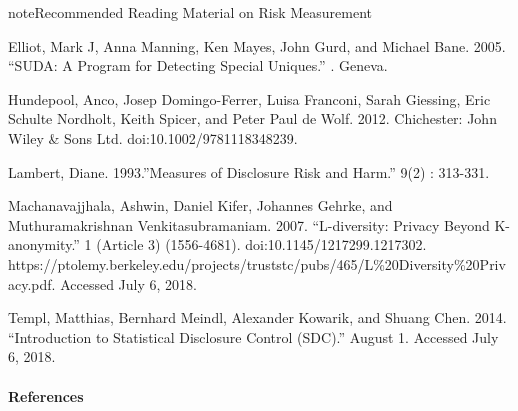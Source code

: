 \documentclass[letterpaper,10pt,english]{sphinxmanual}
\begin{document}
\begin{sphinxadmonition}{note}{Recommended Reading Material on Risk Measurement}

Elliot, Mark J, Anna Manning, Ken Mayes, John Gurd, and Michael Bane.
2005. “SUDA: A Program for Detecting Special Uniques.” .
Geneva.

Hundepool, Anco, Josep Domingo-Ferrer, Luisa Franconi, Sarah Giessing,
Eric Schulte Nordholt, Keith Spicer, and Peter Paul de Wolf. 2012.
 Chichester: John Wiley \& Sons Ltd.
doi:10.1002/9781118348239.

Lambert, Diane. 1993.”Measures of Disclosure Risk and Harm.”  9(2) : 313-331.

Machanavajjhala, Ashwin, Daniel Kifer, Johannes Gehrke, and
Muthuramakrishnan Venkitasubramaniam. 2007. “L-diversity: Privacy Beyond
K-anonymity.”  1 (Article 3)
(1556-4681). doi:10.1145/1217299.1217302.
https://ptolemy.berkeley.edu/projects/truststc/pubs/465/L\%20Diversity\%20Privacy.pdf. Accessed
July 6, 2018.

Templ, Matthias, Bernhard Meindl, Alexander Kowarik, and Shuang Chen.
2014. “Introduction to Statistical Disclosure Control (SDC).”
August 1. Accessed July 6, 2018.
\end{sphinxadmonition}
\paragraph{References}
\end{document}
